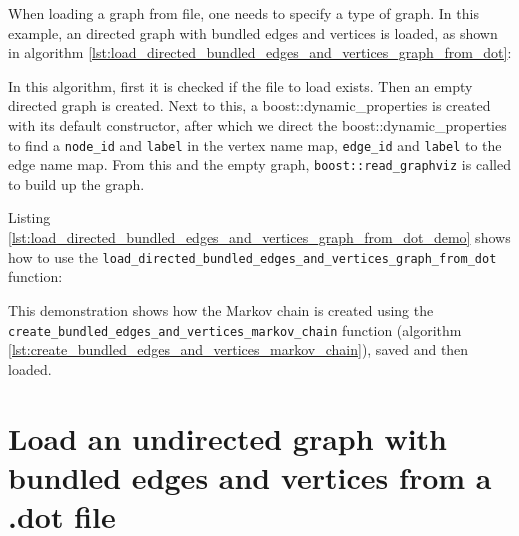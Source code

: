 When loading a graph from file, one needs to specify a type of graph.
In this example, an directed graph with bundled edges and vertices is loaded,
as shown in algorithm \ref{lst:load_directed_bundled_edges_and_vertices_graph_from_dot}:



In this algorithm, first it is checked if the file to load exists.
Then an empty directed graph is created.
Next to this, a boost::dynamic\_properties 
is created with its default constructor, after which we direct the 
boost::dynamic_properties 
to find a \verb;node_id; and \verb;label; in the vertex name map, 
\verb;edge_id; and \verb;label; to the edge name map.
 From this and the empty graph, \verb;boost::read_graphviz;
is called to build up the graph.

Listing 
\ref{lst:load_directed_bundled_edges_and_vertices_graph_from_dot_demo}
shows how to use the \verb;load_directed_bundled_edges_and_vertices_graph_from_dot;
function:



This demonstration shows how the Markov chain is created using 
the \verb;create_bundled_edges_and_vertices_markov_chain; function 
(algorithm \ref{lst:create_bundled_edges_and_vertices_markov_chain}), 
saved and then loaded.

\section{Load an undirected graph with bundled edges and vertices from a .dot file}
\label{subsec:load_undirected_bundled_edges_and_vertices_graph_from_dot}

